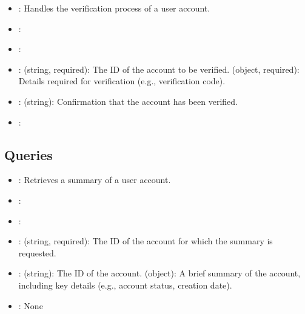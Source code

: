 \documentclass[letterpaper,10pt,english]{sphinxmanual}
\begin{document}
\sphinxAtStartPar
{}
\begin{itemize}
\item {} 
\sphinxAtStartPar
{}: Handles the verification process of a user account.

\item {} 
\sphinxAtStartPar
{}: 

\item {} 
\sphinxAtStartPar
{}: 

\item {} 
\sphinxAtStartPar
{}:
\sphinxhyphen{}  (string, required): The ID of the account to be verified.
\sphinxhyphen{}  (object, required): Details required for verification (e.g., verification code).

\item {} 
\sphinxAtStartPar
{}:
\sphinxhyphen{}  (string): Confirmation that the account has been verified.

\item {} 
\sphinxAtStartPar
{}: 

\end{itemize}


\subsection{Queries}
\label{\detokenize{administration_concession_system/accounts_summary_service:queries}}
\sphinxAtStartPar
{}
\begin{itemize}
\item {} 
\sphinxAtStartPar
{}: Retrieves a summary of a user account.

\item {} 
\sphinxAtStartPar
{}: 

\item {} 
\sphinxAtStartPar
{}: 

\item {} 
\sphinxAtStartPar
{}:
\sphinxhyphen{}  (string, required): The ID of the account for which the summary is requested.

\item {} 
\sphinxAtStartPar
{}:
\sphinxhyphen{}  (string): The ID of the account.
\sphinxhyphen{}  (object): A brief summary of the account, including key details (e.g., account status, creation date).

\item {} 
\sphinxAtStartPar
{}: None

\end{itemize}
\end{document}
